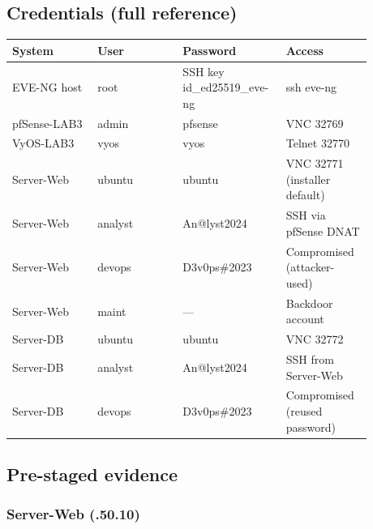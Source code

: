 \subsection{Credentials (full reference)}

{\footnotesize\begin{longtable}[]{@{}>{\raggedright\arraybackslash}p{0.22\linewidth}
  >{\raggedright\arraybackslash}p{0.22\linewidth}
  >{\raggedright\arraybackslash}p{0.22\linewidth}
  >{\raggedright\arraybackslash}p{0.22\linewidth}@{}}
\toprule\noalign{}
System & User & Password & Access \\
\midrule\noalign{}
\endhead
\bottomrule\noalign{}
\endlastfoot
EVE-NG host & root & SSH key id\_ed25519\_eve-ng & ssh eve-ng \\
pfSense-LAB3 & admin & pfsense & VNC 32769 \\
VyOS-LAB3 & vyos & vyos & Telnet 32770 \\
Server-Web & ubuntu & ubuntu & VNC 32771 (installer default) \\
Server-Web & analyst & An@lyst2024 & SSH via pfSense DNAT \\
Server-Web & devops & D3v0ps\#2023 & Compromised (attacker-used) \\
Server-Web & maint & --- & Backdoor account \\
Server-DB & ubuntu & ubuntu & VNC 32772 \\
Server-DB & analyst & An@lyst2024 & SSH from Server-Web \\
Server-DB & devops & D3v0ps\#2023 & Compromised (reused password) \\
\end{longtable}}

\subsection{Pre-staged evidence}

\subsubsection{\texorpdfstring{Server-Web ({.50.10})}{Server-Web (192.168.50.10)}}

